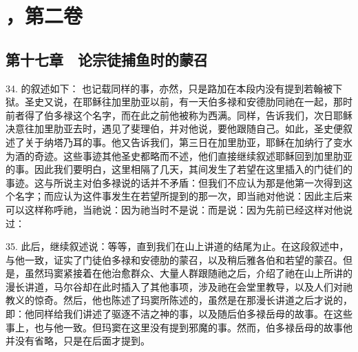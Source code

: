 

\section{，第二卷}


\subsection{第十七章　论宗徒捕鱼时的蒙召}

34. 的叙述如下： 也记载同样的事，亦然，只是路加在本段内没有提到若翰被下狱。圣史又说，在耶稣往加里肋亚以前，有一天伯多禄和安德肋同祂在一起，那时前者得了伯多禄这个名字，而在此之前他被称为西满。同样，告诉我们，次日耶稣决意往加里肋亚去时，遇见了斐理伯，并对他说，要他跟随自己。如此，圣史便叙述了关于纳塔乃耳的事。他又告诉我们，第三日在加里肋亚，耶稣在加纳行了变水为酒的奇迹。这些事迹其他圣史都略而不述，他们直接继续叙述耶稣回到加里肋亚的事。因此我们要明白，这里相隔了几天，其间发生了若望在这里插入的门徒们的事迹。这与所说主对伯多禄说的话并不矛盾：但我们不应认为那是他第一次得到这个名字；而应认为这件事发生在若望所提到的那一次，即当祂对他说：因此主后来可以这样称呼祂，当祂说：因为祂当时不是说：而是说：因为先前已经这样对他说过：\par

35. 此后，继续叙述说：等等，直到我们在山上讲道的结尾为止。在这段叙述中，与他一致，证实了门徒伯多禄和安德肋的蒙召，以及稍后雅各伯和若望的蒙召。但是，虽然玛窦紧接着在他治愈群众、大量人群跟随祂之后，介绍了祂在山上所讲的漫长讲道，马尔谷却在此时插入了其他事项，涉及祂在会堂里教导，以及人们对祂教义的惊奇。然后，他也陈述了玛窦所陈述的，虽然是在那漫长讲道之后才说的，即：他同样给我们讲述了驱逐不洁之神的事，以及随后伯多禄岳母的故事。在这些事上，也与他一致。但玛窦在这里没有提到邪魔的事。然而，伯多禄岳母的故事他并没有省略，只是在后面才提到。\par

